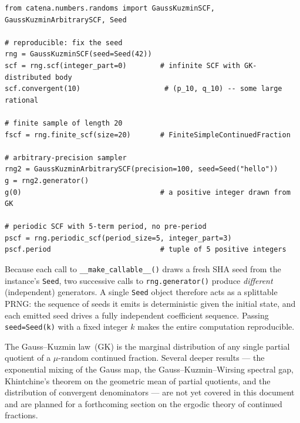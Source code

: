 \begin{catenadef}
\begin{lstlisting}[style=python]
from catena.numbers.randoms import GaussKuzminSCF, GaussKuzminArbitrarySCF, Seed

# reproducible: fix the seed
rng = GaussKuzminSCF(seed=Seed(42))
scf = rng.scf(integer_part=0)        # infinite SCF with GK-distributed body
scf.convergent(10)                    # (p_10, q_10) -- some large rational

# finite sample of length 20
fscf = rng.finite_scf(size=20)       # FiniteSimpleContinuedFraction

# arbitrary-precision sampler
rng2 = GaussKuzminArbitrarySCF(precision=100, seed=Seed("hello"))
g = rng2.generator()
g(0)                                 # a positive integer drawn from GK

# periodic SCF with 5-term period, no pre-period
pscf = rng.periodic_scf(period_size=5, integer_part=3)
pscf.period                          # tuple of 5 positive integers
\end{lstlisting}
\end{catenadef}

\begin{remark}
  Because each call to \texttt{\_\_make\_callable\_\_()} draws a fresh
  SHA seed from the instance's \texttt{Seed}, two successive calls to
  \texttt{rng.generator()} produce \emph{different} (independent)
  generators.  A single \texttt{Seed} object therefore acts as a
  splittable PRNG: the sequence of seeds it emits is deterministic given
  the initial state, and each emitted seed drives a fully independent
  coefficient sequence.  Passing \texttt{seed=Seed(k)} with a fixed
  integer $k$ makes the entire computation reproducible.
\end{remark}

\begin{remark}
  The Gauss--Kuzmin law~(GK) is the marginal distribution of any single
  partial quotient of a $\mu$-random continued fraction.  Several deeper
  results --- the exponential mixing of the Gauss map, the
  Gauss--Kuzmin--Wirsing spectral gap, Khintchine's theorem on the
  geometric mean of partial quotients, and the distribution of convergent
  denominators --- are not yet covered in this document and are planned
  for a forthcoming section on the ergodic theory of continued fractions.
\end{remark}
